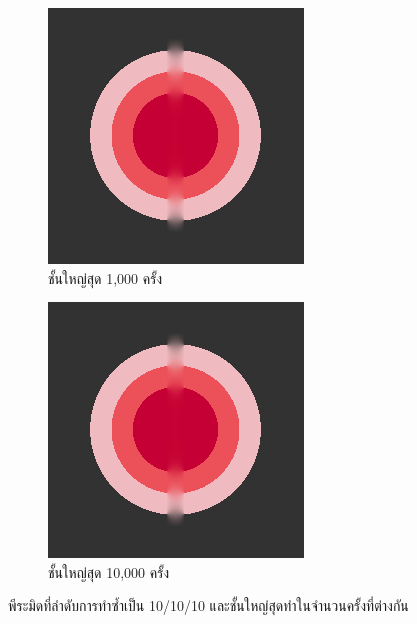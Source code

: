 \documentclass[hidelinks, a4paper,12pt]{article}
\numberwithin{equation}{section}							%
\numberwithin{equation}{section}
\begin{document}
{\begin{figure}[H]
\begin{subfigure}{0.23\linewidth}
			\centering
			\includegraphics[width=0.8\linewidth]{images/just10enough/only1000time.png}			
			\caption{ชั้นใหญ่สุด 1,000 ครั้ง}
		\end{subfigure}
		\begin{subfigure}{0.23\linewidth}
			\centering
			\includegraphics[width=0.8\linewidth]{images/just10enough/only10000time.png}			
			\caption{ชั้นใหญ่สุด 10,000 ครั้ง}
		\end{subfigure}
		\caption{พีระมิดที่ลำดับการทำซ้ำเป็น 10/10/10 และชั้นใหญ่สุดทำในจำนวนครั้งที่ต่างกัน}
	\end{figure}
	
}
\end{document}
